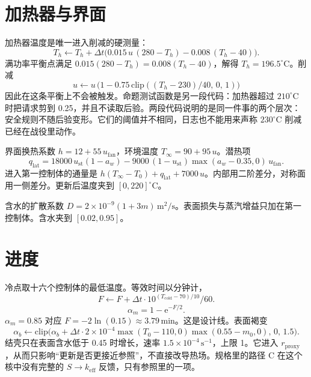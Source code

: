 \section{加热器与界面}

加热器温度是唯一进入削减的硬测量：
\begin{equation}
T_h\leftarrow T_h+\Delta t\Big(0.015\,u\,(280-T_h)-0.008\,(T_h-40)\Big).
\end{equation}
满功率平衡点满足 \(0.015(280-T_h)=0.008(T_h-40)\)，解得 \(T_h=196.5^\circ\mathrm{C}\)。削减
\begin{equation}
u\leftarrow u\,\big(1-0.75\,\mathrm{clip}((T_h-230)/40,\,0,\,1)\big)
\end{equation}
因此在这条平衡上不会被触发。命题测试函数是另一段代码：加热器超过 \(210^\circ\mathrm{C}\) 时把请求剪到 0.25，并且不读取后验。两段代码说明的是同一件事的两个层次：安全规则不随后验变形。它们的阈值并不相同，日志也不能用来声称 \(230^\circ\mathrm{C}\) 削减已经在战役里动作。

界面换热系数 \(h=12+55\,u_{\mathrm{fan}}\)，环境温度 \(T_\infty=90+95\,u\)。潜热项
\begin{equation}
q_{\mathrm{lat}}=18000\,u_{\mathrm{st}}(1-a_w)-9000\,(1-u_{\mathrm{st}})\max(a_w-0.35,0)\,u_{\mathrm{fan}}.
\end{equation}
进入第一控制体的通量是 \(h(T_\infty-T_0)+q_{\mathrm{lat}}+7000\,u\)。内部用二阶差分，对称面用一侧差分。更新后温度夹到 \([0,220]^\circ\mathrm{C}\)。

含水的扩散系数 \(D=2\times 10^{-9}(1+3m)\,\mathrm{m}^2/\mathrm{s}\)。表面损失与蒸汽增益只加在第一控制体。含水夹到 \([0.02,0.95]\)。

\section{进度}

冷点取十六个控制体的最低温度。等效时间以分钟计，
\begin{equation}
F\leftarrow F+\Delta t\cdot 10^{(T_{\mathrm{cold}}-70)/10}/60.
\end{equation}
\begin{equation}
\alpha_m=1-\mathrm{e}^{-F/2}.
\end{equation}
\(\alpha_m=0.85\) 对应 \(F=-2\ln(0.15)\approx 3.79\,\mathrm{min}\)。这是设计线。表面褐变
\begin{equation}
\alpha_b\leftarrow\mathrm{clip}\Big(\alpha_b+\Delta t\cdot 2\times 10^{-4}\max(T_0-110,0)\max(0.55-m_0,0),\,0,\,1.5\Big).
\end{equation}
结壳只在表面含水低于 0.45 时增长，速率 \(1.5\times 10^{-4}\,\mathrm{s}^{-1}\)，上限 1。它进入 \(r_{\mathrm{proxy}}\)，从而只影响“更新是否更接近参照”，不直接改导热场。规格里的路径 C 在这个核中没有完整的 \(S\to k_{\mathrm{eff}}\) 反馈，只有参照里的一项。

